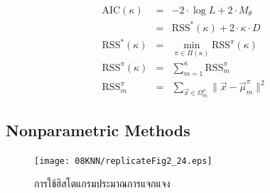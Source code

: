 \begin{eqnarray}
   \mathrm{AIC}(\kappa) &=& -2 \cdot \log L + 2 \cdot M_{\theta} 
\nonumber \\
   &=& \mathrm{RSS}^*(\kappa) + 2 \cdot \kappa \cdot D 
\label{eq: AIC for K-means} \\
   \mathrm{RSS}^*(\kappa) &=& \min_{\pi \in \Pi(\kappa)} \mathrm{RSS}^{\pi} (\kappa)
\label{eq: best clustering RSS} \\
\mathrm{RSS}^{\pi} (\kappa) &=& \sum_{m=1}^{\kappa} \mathrm{RSS}^{\pi}_m
\label{eq: clustering RSS} \\
\mathrm{RSS}^{\pi}_m &=& \sum_{\vec{x} \in \Omega_m^{\pi}} \| \vec{x} - \vec{\mu}_m^{\pi} \|^2
\label{eq: cluster RSS}
\end{eqnarray}


\subsection{Nonparametric Methods}

%
\begin{figure}
\begin{center}
\texttt{[image: 08KNN/replicateFig2\_24.eps]}
\end{center}
\caption{การใช้ฮิสโตแกรมประมาณการแจกแจง}
\label{fig: ch03 nonparam histogram}
\end{figure}

